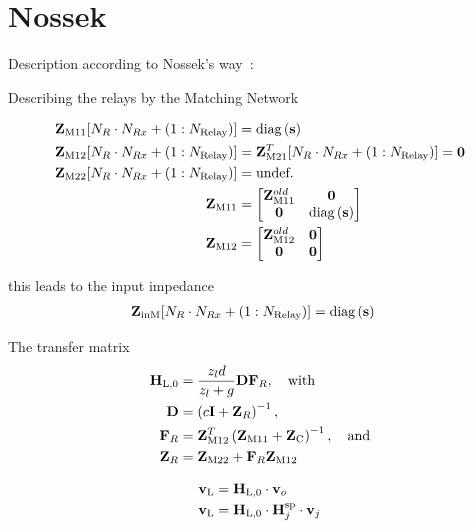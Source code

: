 \chapter{Nossek}
\label{sec:nossek}


Description according to Nossek's way~\cite{Nossek}:

Describing the relays by the Matching Network

\begin{align}
\label{eq:nossek_matching}
\mathbf{Z}_\text{M11}[N_R\cdot N_{Rx}+\left(1:N_\text{Relay}\right)] &= \text{diag}\left(\mathbf{s}\right)\\
\mathbf{Z}_\text{M12}[N_R\cdot N_{Rx}+\left(1:N_\text{Relay}\right)] &= 
	\mathbf{Z}_\text{M21}^T[N_R\cdot N_{Rx}+\left(1:N_\text{Relay}\right)] = \mathbf{0}\\
\mathbf{Z}_\text{M22}[N_R\cdot N_{Rx}+\left(1:N_\text{Relay}\right)] &= \text{undef.}\\
\mathbf{Z}_\text{M11} &=
\begin{bmatrix}
\mathbf{Z}_\text{M11}^{old} & \mathbf{0}\\
\mathbf{0}	& \text{diag}\left(\mathbf{s}\right)
\end{bmatrix}\\
\mathbf{Z}_\text{M12}&=
\begin{bmatrix}
\mathbf{Z}_\text{M12}^{old} & \mathbf{0}\\
\mathbf{0}	& \mathbf{0}
\end{bmatrix}
\end{align}

this leads to the input impedance
\begin{align}
\label{eq:nossek_matching}
\mathbf{Z}_\text{inM}[N_R\cdot N_{Rx}+\left(1:N_\text{Relay}\right)] &= \text{diag}\left(\mathbf{s}\right)
\end{align}



The transfer matrix
\begin{align}
\label{eq:nossek_transf}
\mathbf{H}_\text{L,0} &= \frac{z_l d}{z_l + g}\mathbf{D}\mathbf{F}_R,\quad\text{with}\\
\mathbf{D} &= \left(c\mathbf{I} + \mathbf{Z}_R\right)^{-1},\\
\mathbf{F}_R &= \mathbf{Z}_\text{M12}^T\left(\mathbf{Z}_\text{M11}+\mathbf{Z}_\text{C}\right)^{-1},\quad\text{and}\\
\mathbf{Z}_R &= \mathbf{Z}_\text{M22} + \mathbf{F}_R\mathbf{Z}_\text{M12}
\end{align}

\begin{align}
\mathbf{v}_\text{L} &= \mathbf{H}_\text{L,0}\cdot\mathbf{v}_o\\
\mathbf{v}_\text{L} &= \mathbf{H}_\text{L,0}\cdot\mathbf{H}_{j}^{\text{sp}}\cdot\mathbf{v}_j
\end{align}

